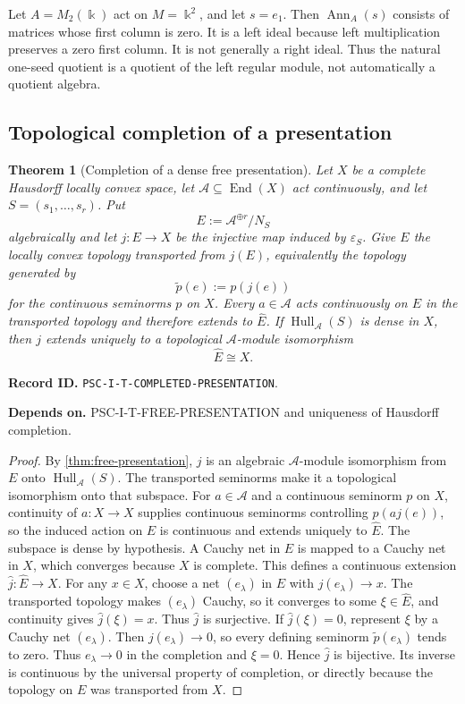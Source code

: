 \documentclass[11pt]{article}
\newtheorem{theorem}{Theorem}[section]
\theoremstyle{definition}
\theoremstyle{remark}
\newcommand{\bbk}{\Bbbk}
\newcommand{\A}{\mathcal A}
\newcommand{\Hull}{\operatorname{Hull}}
\newcommand{\End}{\operatorname{End}}
\newcommand{\RecordID}[1]{\par\smallskip\noindent\begingroup\footnotesize\color{PSCGray}\raggedright\textbf{Record ID.} \nolinkurl{#1}.\par\endgroup}
\newcommand{\Depends}[1]{\par\noindent\begingroup\footnotesize\color{PSCGray}\raggedright\textbf{Depends on.} #1\par\endgroup}
\begin{document}
\begin{microexample}[title={Why the annihilator need not be two-sided}]
Let \(A=M_2(\bbk)\) act on \(M=\bbk^2\), and let \(s=e_1\).  Then \(\operatorname{Ann}_A(s)\) consists of matrices whose first column is zero.  It is a left ideal because left multiplication preserves a zero first column.  It is not generally a right ideal.  Thus the natural one-seed quotient is a quotient of the left regular module, not automatically a quotient algebra.
\end{microexample}


\subsection{Topological completion of a presentation}
\begin{theorem}[Completion of a dense free presentation]
\label{thm:completed-presentation}
Let $X$ be a complete Hausdorff locally convex space, let $\A\subseteq\End(X)$ act continuously, and let $S=(s_1,\ldots,s_r)$.  Put
\[
E:=\A^{\oplus r}/N_S
\]
algebraically and let $j:E\to X$ be the injective map induced by $\varepsilon_S$.  Give $E$ the locally convex topology transported from $j(E)$, equivalently the topology generated by
\[
\widetilde p(e):=p(j(e))
\]
for the continuous seminorms $p$ on $X$.  Every $a\in\A$ acts continuously on $E$ in the transported topology and therefore extends to $\widehat E$.  If $\Hull_{\A}(S)$ is dense in $X$, then $j$ extends uniquely to a topological $\A$-module isomorphism
\[
\boxed{\widehat E\cong X.}
\]
\end{theorem}
\RecordID{PSC-I-T-COMPLETED-PRESENTATION}
\Depends{PSC-I-T-FREE-PRESENTATION and uniqueness of Hausdorff completion.}

\begin{proof}
By \cref{thm:free-presentation}, $j$ is an algebraic $\A$-module isomorphism from $E$ onto $\Hull_{\A}(S)$.  The transported seminorms make it a topological isomorphism onto that subspace.  For $a\in\A$ and a continuous seminorm $p$ on $X$, continuity of $a:X\to X$ supplies continuous seminorms controlling $p(aj(e))$, so the induced action on $E$ is continuous and extends uniquely to $\widehat E$.  The subspace is dense by hypothesis.  A Cauchy net in $E$ is mapped to a Cauchy net in $X$, which converges because $X$ is complete.  This defines a continuous extension $\widehat j:\widehat E\to X$.  For any $x\in X$, choose a net $(e_\lambda)$ in $E$ with $j(e_\lambda)\to x$.  The transported topology makes $(e_\lambda)$ Cauchy, so it converges to some $\xi\in\widehat E$, and continuity gives $\widehat j(\xi)=x$.  Thus $\widehat j$ is surjective.  If $\widehat j(\xi)=0$, represent $\xi$ by a Cauchy net $(e_\lambda)$.  Then $j(e_\lambda)\to0$, so every defining seminorm $\widetilde p(e_\lambda)$ tends to zero.  Thus $e_\lambda\to0$ in the completion and $\xi=0$.  Hence $\widehat j$ is bijective.  Its inverse is continuous by the universal property of completion, or directly because the topology on $E$ was transported from $X$.
\end{proof}
\end{document}
